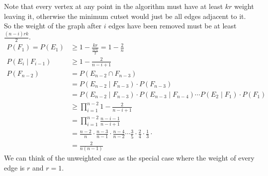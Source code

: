 \documentclass[11pt]{article}
\begin{document}
\begin{enumerate}[(a)]
Note that every vertex at any point in the algorithm must have at least $kr$ weight leaving it, otherwise the minimum cutset would just be all edges adjacent to it. So the weight of the graph after $i$ edges have been removed must be at least $\frac{(n-i)rk}2$.
\begin{align*}
P(F_1) = P(E_1) &\geq 1-\frac{kr}{\frac{nrk}2} = 1-\frac2n\\
P(E_i\mid F_{i-1}) &\geq 1-\frac2{n-i+1}\\
P(F_{n-2}) &= P(E_{n-2}\cap F_{n-3})\\
&= P(E_{n-2}\mid F_{n-3})\cdot P(F_{n-3})\\
&= P(E_{n-2}\mid F_{n-3})\cdot P(E_{n-3}\mid F_{n-4})\cdots P(E_2\mid F_1)\cdot P(F_1)\\
&\geq \prod_{i=1}^{n-2} 1-\frac2{n-i+1}\\
&= \prod_{i=1}^{n-2} \frac{n-i-1}{n-i+1}\\
&= \frac{n-2}{n}\cdot\frac{n-3}{n-1}\cdot\frac{n-4}{n-2}\cdots\frac{3}{5}\cdot\frac{2}{4}\cdot\frac{1}{3}\cdot\\
&= \frac2{n(n-1)}
\end{align*}
We can think of the unweighted case as the special case where the weight of every edge is $r$ and $r=1$.
\end{enumerate}
\end{document}
